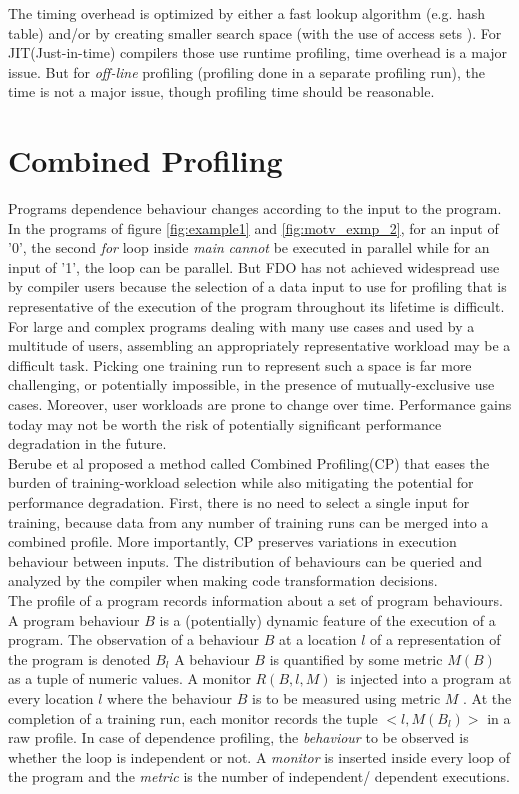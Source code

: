 \documentclass[10pt]{report}          %
\begin{document}
The timing overhead is optimized by either a fast lookup algorithm (e.g. hash table) and/or by creating smaller search space (with the use of access sets \cite{sd}).  For JIT(Just-in-time) compilers those use runtime profiling, time overhead is a major issue.  But for \textit{off-line} profiling (profiling done in a separate profiling run), the time is not a major issue, though profiling time should be reasonable.

\section{Combined Profiling}

Programs dependence behaviour changes according to the input to the program.  In the programs of figure \ref{fig:example1} and \ref{fig:motv_exmp_2}, for an input of '0', the second \textit{for} loop inside \textit{main}  \textit{cannot} be executed in parallel while for an input of '1', the loop can be parallel. But FDO has not achieved widespread use by compiler users because the selection of a data input to use for profiling that is representative of the execution of the program throughout its lifetime is difficult. For large and complex programs dealing with many use cases and used by a multitude of users, assembling an appropriately representative workload may be a difficult
task. Picking one training run to represent such a space is far more challenging, or potentially impossible, in the presence of mutually-exclusive use cases. Moreover, user workloads are prone to change over time. Performance gains today may not be worth the risk of potentially significant performance degradation in the future.\\

Berube et al \cite{BerubeCP} proposed a method called Combined Profiling(CP) that eases the burden of training-workload selection while also mitigating the potential for performance degradation. First, there is no need to select a single input for training, because data from any number of training runs can be
merged into a combined profile. More importantly, CP preserves variations in execution behaviour between inputs. The distribution of behaviours can be queried and analyzed by the compiler when making code transformation decisions. \\

 The profile of a program records information about a set of program behaviours. A program behaviour
$B$ is a (potentially) dynamic feature of the execution of a program. The observation of a behaviour $B$ at a location $l$ of a representation of the program is denoted $B_l$ A behaviour
$B$ is quantified by some metric $M (B)$ as a tuple of numeric values. A monitor $R(B, l, M )$ is injected into a program at every location $l$ where the behaviour $B$ is to be measured
using metric $M$ . At the completion of a training run, each monitor records the tuple $<l, M (B_l )>$ in a raw profile.  In case of dependence profiling, the \textit{behaviour} to be observed is whether the loop is independent or not.  A \textit{monitor} is inserted inside every loop of the program and the \textit{metric} is the number of independent/ dependent executions.  \\
\end{document}
